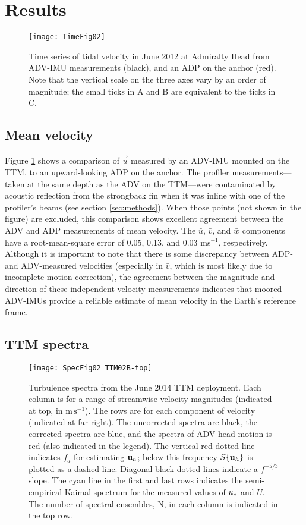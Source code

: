 \section{Results}
\label{sec:results}

\begin{figure}[t]
  \centering
  \texttt{[image: TimeFig02]}
  \caption{Time series of tidal velocity in June 2012 at Admiralty Head from ADV-IMU measurements (black), and an ADP on the anchor (red). Note that the vertical scale on the three axes vary by an order of magnitude; the small ticks in A and B are equivalent to the ticks in C.}
  \label{fig:vel_time}
\end{figure}

\subsection{Mean velocity}

Figure \ref{fig:vel_time} shows a comparison of $\vec{\bar u}$ measured by an ADV-IMU mounted on the TTM, to an upward-looking ADP on the anchor. The profiler measurements---taken at the same depth as the ADV on the TTM---were contaminated by acoustic reflection from the strongback fin when it was inline with one of the profiler's beams (see section \ref{sec:methods}). When those points (not shown in the figure) are excluded, this comparison shows excellent agreement between the ADV and ADP measurements of mean velocity. The $\bar u$, $\bar v$, and $\bar w$ components have a root-mean-square error of 0.05, 0.13, and 0.03 ms$^{-1}$, respectively. Although it is important to note that there is some discrepancy between ADP- and ADV-measured velocities (especially in $\bar v$, which is most likely due to incomplete motion correction), the agreement between the magnitude and direction of these independent velocity measurements indicates that moored ADV-IMUs provide a reliable estimate of mean velocity in the Earth's reference frame.

\subsection{TTM spectra}

\begin{figure*}[t]
  \centering
  \texttt{[image: SpecFig02\_TTM02B-top]}
  \caption{Turbulence spectra from the June 2014 TTM deployment. Each column is for a range of streamwise velocity magnitudes (indicated at top, in $\mathrm{m\,s^{-1}}$). The rows are for each component of velocity (indicated at far right). The uncorrected spectra are black, the corrected spectra are blue, and the spectra of ADV head motion is red (also indicated in the legend). The vertical red dotted line indicates $f_a$ for estimating $\mathbf{u}_{h}$; below this frequency $S\{\mathbf{u}_{h}\}$ is plotted as a dashed line.   Diagonal black dotted lines indicate a $f^{-5/3}$ slope. The cyan line in the first and last rows indicates the semi-empirical Kaimal spectrum for the measured values of $u_*$ and $\bar U$. The number of spectral ensembles, N, in each column is indicated in the top row.}
  \label{fig:spec:ttm}
\end{figure*}


